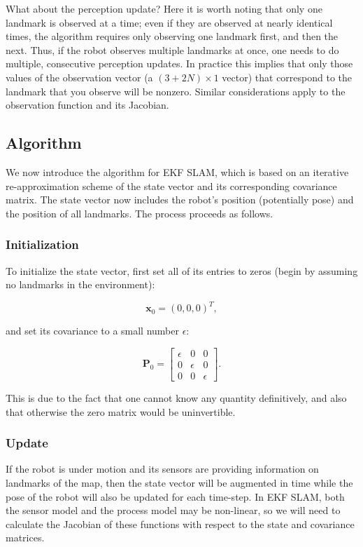 What about the perception update? Here it is worth noting that only one landmark is observed at a time; even if they are observed at nearly identical times, the algorithm requires only observing one landmark first, and then the next. Thus, if the robot observes multiple landmarks at once, one needs to do multiple, consecutive perception updates. In practice this implies that only those values of the observation vector (a $(3+2N) \times 1$ vector) that correspond to the landmark that you observe will be nonzero. Similar considerations apply to the observation function and its Jacobian.

\subsection{Algorithm} \label{sec:ekfslam_alg}
We now introduce the algorithm for EKF SLAM, which is based on an iterative re-approximation scheme of the state vector and its corresponding covariance matrix. The state vector now includes the robot's position (potentially pose) and the position of all landmarks. The process proceeds as follows.

\subsubsection{Initialization}
To initialize the state vector, first set all of its entries to zeros (begin by assuming no landmarks in the environment):

\begin{equation}
    \boldsymbol{x}_0 = (0,0,0)^T,
\end{equation}

\noindent and set its covariance to a small number $\epsilon$:

\begin{equation}
    \boldsymbol{P}_0 = \begin{bmatrix} \epsilon & 0 & 0 \\ 0 & \epsilon & 0 \\ 0 & 0 & \epsilon \end{bmatrix}.
\end{equation}

This is due to the fact that one cannot know any quantity definitively, and also that otherwise the zero matrix would be uninvertible.

\subsubsection{Update}
If the robot is under motion and its sensors are providing information on landmarks of the map, then the state vector will be augmented in time while the pose of the robot will also be updated for each time-step. In EKF SLAM, both the sensor model and the process model may be non-linear, so we will need to calculate the Jacobian of these functions with respect to the state and covariance matrices.

